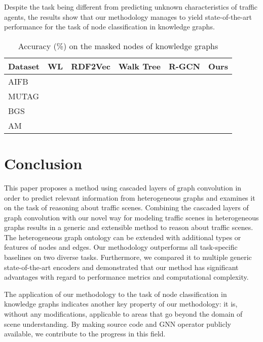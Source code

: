 \documentclass[letterpaper, 10 pt, journal, twoside]{IEEEtran}
\begin{document}
Despite the task being different from predicting unknown characteristics of traffic agents, the results show that our methodology manages to yield state-of-the-art performance for the task of node classification in knowledge graphs.

\begin{table}[!t]
	\scriptsize
	\caption{Accuracy (\%) on the masked nodes of knowledge graphs}
	\vspace{-0.1cm}
	\label{tab:results_kg}
	\setlength{\tabcolsep}{2pt}
	\centering
	\begin{tabularx}{\columnwidth}{Xlllll}
		\toprule
		Dataset & WL \cite{Shervashidze2011}                & RDF2Vec \cite{Ristoski2019}      & Walk Tree \cite{Vandewiele2019}  & R-GCN \cite{Schlichtkrull2018}            & Ours                                      \\ \midrule
		AIFB    &           &  &  &  &  \\
		MUTAG   &  &  &  &           &           \\
		BGS     &           &  &  &           &  \\
		AM      &           &  &  &           &  \\ \bottomrule
	\end{tabularx}
	\vspace{-0.2cm}
\end{table} 

\section{Conclusion}
This paper proposes a method using cascaded layers of graph convolution in order to predict relevant information from heterogeneous graphs and examines it on the task of reasoning about traffic scenes.
Combining the cascaded layers of graph convolution with our novel way for modeling traffic scenes in heterogeneous graphs results in a generic and extensible method to reason about traffic scenes.
The heterogeneous graph ontology can be extended with additional types or features of nodes and edges.
Our methodology outperforms all task-specific baselines on two diverse tasks.
Furthermore, we compared it to multiple generic state-of-the-art encoders and demonstrated that our method has significant advantages with regard to performance metrics and computational complexity.

The application of our methodology to the task of node classification in knowledge graphs indicates another key property of our methodology:
it is, without any modifications, applicable to areas that go beyond the domain of scene understanding.
By making source code and GNN operator publicly available, we contribute to the progress in this field.

\ifCLASSOPTIONcaptionsoff
  \newpage
\fi




\enlargethispage{-5in}
\end{document}
